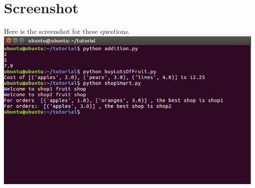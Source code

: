 \documentclass[aps,letterpaper,10pt]{revtex4}
\begin{document}
\section{Screenshot}
Here is the screenshot for these questions.\\
\includegraphics[scale=0.8]{Screenshot.png}
\end{document}
